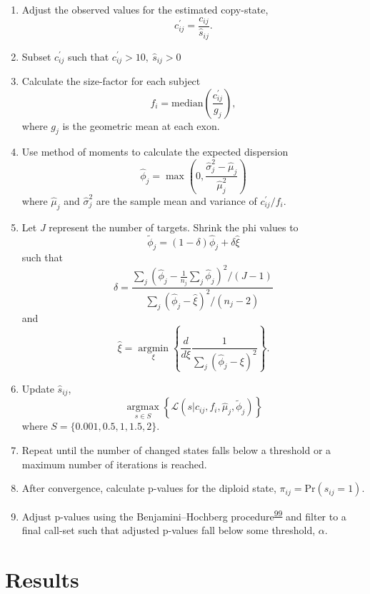 \documentclass[11pt,letterpaper]{book}
\begin{document}
\begin{enumerate}
\def\labelenumi{\arabic{enumi}.}
\item
  Adjust the observed values for the estimated copy-state,
  \[
    c_{ij}^{\prime} = \frac{c_{ij}}{\hat{s}_{ij}}.
    \]
\item
  Subset \(c_{ij}^{\prime}\) such that \(c_{ij}^{\prime} > 10, ~ \hat{s}_{ij} > 0\)
\item
  Calculate the size-factor for each subject
  \[
    f_i = \text{median}\left(\frac{c_{ij}^{\prime}}{g_j}\right),
    \]
  where \(g_j\) is the geometric mean at each exon.
\item
  Use method of moments to calculate the expected dispersion
  \[
    \hat\phi_j = \max\left(0, \frac{\hat\sigma_j^2 - \hat{\mu}_j}{\hat{\mu}_j^2}\right)
    \]
  where \(\hat{\mu}_j\) and \(\hat{\sigma}_j^2\) are the sample mean and variance of \(c_{ij}^{\prime}/f_i\).
\item
  Let \(J\) represent the number of targets. Shrink the phi values to
  \[
    \tilde\phi_j = (1 - \delta)\hat\phi_j + \delta\hat{\xi}
    \]
  such that
  \[
    \delta = \frac{\sum\limits_j\left(\hat\phi_j - \frac{1}{n_j}\sum\limits_j \hat\phi_j\right)^2/(J - 1)}
    {\sum\limits_j\left(\hat\phi_j - \hat{\xi}\right)^2/(n_j - 2)}
    \]
  and
  \[
    \hat{\xi} = \mathop{\text{argmin}}\limits_{\xi}\left\{
    \frac{d}{d\xi}\frac{1}{\sum\limits_j \left(\hat\phi_j - \xi\right)^2}
    \right\}.
    \]
\item
  Update \(\hat{s}_{ij}\),
  \[
    \mathop{\text{argmax}}\limits_{s \in S}\left\{
    \mathcal{L}(s \rvert c_{ij},f_i,\hat\mu_j,\tilde\phi_j)
    \right\}
    \]
  where \(S = \{0.001, 0.5, 1, 1.5, 2\}\).
\item
  Repeat until the number of changed states falls below a threshold or a maximum number of iterations is reached.
\item
  After convergence, calculate p-values for the diploid state, \(\pi_{ij} = \text{Pr}(s_{ij} = 1)\).
\item
  Adjust p-values using the Benjamini--Hochberg procedure\textsuperscript{\protect\hyperlink{ref-benjamini:1995aa}{99}} and filter to a final call-set such that adjusted p-values fall below some threshold, \(\alpha\).
\end{enumerate}

\hypertarget{results}{%
\section{Results}\label{results}}
\end{document}
